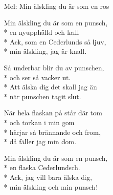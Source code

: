\begin{SongText}
    \begin{SongInfo}
        Mel: Min älskling du är som en ros
    \end{SongInfo}
    \begin{SongVerse}
        Min älskling du är som en punsch,\\*%
        en nyupphälld och kall.\\*%
        Ack, som en Cederlunds så ljuv,\\*%
        min älskling, jag är knall.
    \end{SongVerse}
    \begin{SongVerse}
        Så underbar blir du av punschen,\\*%
        och ser så vacker ut.\\*%
        Att älska dig det skall jag än\\*%
        när punschen tagit slut.
    \end{SongVerse}
    \begin{SongVerse}
        När hela flaskan på står där tom\\*%
        och torkan i min gom\\*%
        härjar så brännande och from,\\*%
        då fäller jag min dom.
    \end{SongVerse}
    \begin{SongVerse}
        Min älskling du är som en punsch,\\*%
        en flaska Cederlundsch.\\*%
        Ack, jag vill bara älska dig,\\*%
        min älskling och min punsch!
    \end{SongVerse}
\end{SongText}